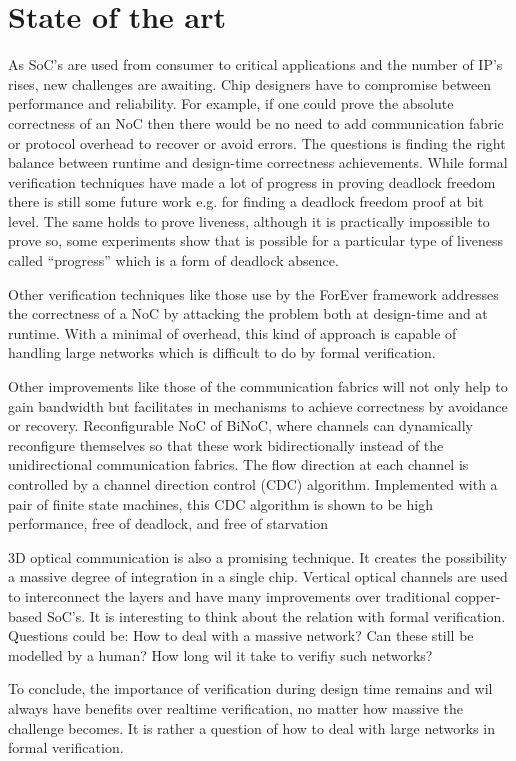 \section{State of the art}

As SoC's are used from consumer to critical applications and the number of IP's
rises, new challenges are awaiting. Chip designers have to compromise between
performance and reliability. For example, if one could prove the absolute
correctness of an NoC then there would be no need to add communication fabric or
protocol overhead to recover or avoid errors. The questions is finding the right
balance between runtime and design-time correctness achievements. While formal
verification techniques have made a lot of progress in proving deadlock freedom
there is still some future work e.g. for finding a deadlock freedom proof at bit
level. The same holds to prove liveness, although it is practically impossible to
prove so, some experiments show that is possible for a particular type of
liveness called ``progress'' which is a form of deadlock absence.
\cite{Ray:2012:SPV:2492708.2492936,itp}

Other verification techniques like those use by the ForEver framework addresses
the correctness of a NoC by attacking the problem both at design-time and at
runtime. With a minimal of overhead, this kind of approach is capable of
handling large networks which is difficult to do by formal verification.
\cite{Parikh:2014:FCF:2597868.2514871}

Other improvements like those of the communication fabrics will not only help to
gain bandwidth but facilitates in mechanisms to achieve correctness by avoidance
or recovery. Reconfigurable NoC of BiNoC, where channels can dynamically
reconfigure themselves so that these work bidirectionally instead of the
unidirectional communication fabrics. The flow direction at each channel is
controlled by a channel direction control (CDC) algorithm. Implemented with a
pair of finite state machines, this CDC algorithm is shown to be high
performance, free of deadlock, and free of starvation \cite{5715603}

3D optical communication is also a promising technique. It creates the
possibility a massive degree of integration in a single chip. Vertical optical
channels are used to interconnect the layers and have many improvements over
traditional copper-based SoC's. It is interesting to think about the relation
with formal verification. Questions could be: How to deal with a massive
network? Can these still be modelled by a human? How long wil it take to verifiy
such networks?

To conclude, the importance of verification during design time remains and wil
always have benefits over realtime verification, no matter how massive the
challenge becomes. It is rather a question of how to deal with large networks in
formal verification. \cite{4542033,5306588}


\newpage

